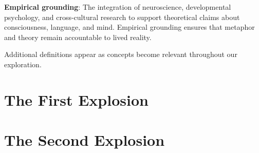 \documentclass[12pt,letterpaper]{book}
\begin{document}
\textbf{Empirical grounding}: The integration of neuroscience, developmental psychology, and cross-cultural research to support theoretical claims about consciousness, language, and mind. Empirical grounding ensures that metaphor and theory remain accountable to lived reality.

Additional definitions appear as concepts become relevant throughout our exploration.

\part{The First Explosion}

\fancyhead[LO]{}

















\part{The Second Explosion}























\printbibliography
\end{document}
